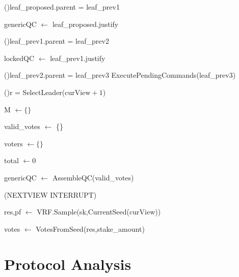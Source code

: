 \documentclass[11pt, oneside]{article}       %
\begin{document}
\begin{algorithm}[H]
{        \If(){leaf\_proposed.parent = leaf\_prev1}{%
            genericQC \(\leftarrow\) leaf\_proposed.justify

            \If(){leaf\_prev1.parent = leaf\_prev2}{%
                lockedQC \(\leftarrow\) leaf\_prev1.justify

                \If(){leaf\_prev2.parent =
                leaf\_prev3}{%
                    ExecutePendingCommands(leaf\_prev3)
                }
            }
        }

        \If(){r =
        SelectLeader(\(\text{curView}+1\))}{%
            M \(\leftarrow \{\}\)

            valid\_votes \(\leftarrow\) \{\}

            voters \(\leftarrow \{\}\)

            total \(\leftarrow 0\)


            genericQC \(\leftarrow\) AssembleQC(valid\_votes)

        }

        \Begin(NEXTVIEW INTERRUPT){%
            res,pf \(\leftarrow\) VRF.Sample(sk,CurrentSeed(curView))

            votes \(\leftarrow\) VotesFromSeed(res,stake\_amount)


        }
    }

\end{algorithm}

\section{Protocol Analysis}
\end{document}
